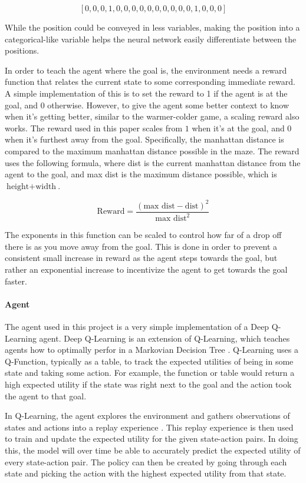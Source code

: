 \documentclass[12pt]{article}
\begin{document}
$$\left[0,0,0,1,0,0,0,0,0,0,0,0,0,0,1,0,0,0\right]$$

While the position could be conveyed in less variables, making the position into a categorical-like variable helps the neural network easily differentiate between the positions.


In order to teach the agent where the goal is, the environment needs a reward function that relates the current state to some corresponding immediate reward.
A simple implementation of this is to set the reward to 1 if the agent is at the goal, and 0 otherwise.
However, to give the agent some better context to know when it's getting better, similar to the warmer-colder game, a scaling reward also works.
The reward used in this paper scales from $1$ when it's at the goal, and $0$ when it's furthest away from the goal.
Specifically, the manhattan distance is compared to the maximum manhattan distance possible in the maze.
The reward uses the following formula, where dist is the current manhattan distance from the agent to the goal, and max dist is the maximum distance possible, which is $\text{height} + \text{width}$.

$$\text{Reward} = \frac{(\text{max dist} - \text{dist}) ^ 2}{\text{max dist}^2}$$

The exponents in this function can be scaled to control how far of a drop off there is as you move away from the goal.
This is done in order to prevent a consistent small increase in reward as the agent steps towards the goal, but rather an exponential increase to incentivize the agent to get towards the goal faster.

\paragraph{Agent}

The agent used in this project is a very simple implementation of a Deep Q-Learning agent.
Deep Q-Learning is an extension of Q-Learning, which teaches agents how to optimally perfor in a Markovian Decision Tree \cite{article_q_learning}.
Q-Learning uses a Q-Function, typically as a table, to track the expected utilities of being in some state and taking some action.
For example, the function or table would return a high expected utility if the state was right next to the goal and the action took the agent to that goal.

In Q-Learning, the agent explores the environment and gathers observations of states and actions into a replay experience \cite{article_reinforcement_learning_for_robots}.
This replay experience is then used to train and update the expected utility for the given state-action pairs.
In doing this, the model will over time be able to accurately predict the expected utility of every state-action pair.
The policy can then be created by going through each state and picking the action with the highest expected utility from that state.
\end{document}
